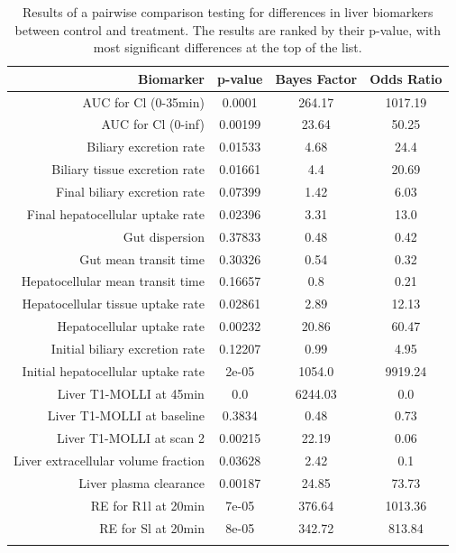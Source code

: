 \documentclass{epflreport}%
\begin{document}
%
\begin{longtable}{rccc}%
\hline%
Biomarker&p{-}value&Bayes Factor&Odds Ratio\\%
\hline%
AUC for Cl (0{-}35min)&0.0001&264.17&1017.19\\%
AUC for Cl (0{-}inf)&0.00199&23.64&50.25\\%
Biliary excretion rate&0.01533&4.68&24.4\\%
Biliary tissue excretion rate&0.01661&4.4&20.69\\%
Final biliary excretion rate&0.07399&1.42&6.03\\%
Final hepatocellular uptake rate&0.02396&3.31&13.0\\%
Gut dispersion&0.37833&0.48&0.42\\%
Gut mean transit time&0.30326&0.54&0.32\\%
Hepatocellular mean transit time&0.16657&0.8&0.21\\%
Hepatocellular tissue uptake rate&0.02861&2.89&12.13\\%
Hepatocellular uptake rate&0.00232&20.86&60.47\\%
Initial biliary excretion rate&0.12207&0.99&4.95\\%
Initial hepatocellular uptake rate&2e{-}05&1054.0&9919.24\\%
Liver T1{-}MOLLI at 45min&0.0&6244.03&0.0\\%
Liver T1{-}MOLLI at baseline&0.3834&0.48&0.73\\%
Liver T1{-}MOLLI at scan 2&0.00215&22.19&0.06\\%
Liver extracellular volume fraction&0.03628&2.42&0.1\\%
Liver plasma clearance&0.00187&24.85&73.73\\%
RE for R1l at 20min&7e{-}05&376.64&1013.36\\%
RE for Sl at 20min&8e{-}05&342.72&813.84\\%
\hline%
\caption{Results of a pairwise comparison testing for differences in liver biomarkers between control and treatment. The results are ranked by their p-value, with most significant differences at the top of the list.} \\%
\end{longtable}%
\end{document}
